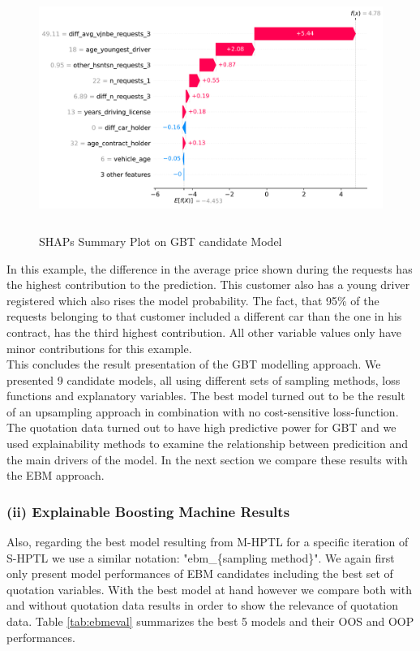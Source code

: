 \documentclass[12pt,titlepage]{article}
\begin{document}
\begin{figure}[H]
    \centerline{\includegraphics[height=8cm]{shap_waterfall_example.png}}
    \caption{SHAPs Summary Plot on GBT candidate Model}
    \label{fig:shapsum}
\end{figure}
\noindent
In this example, the difference in the average price shown during the requests has the highest contribution to the prediction. This customer also has a young driver registered which also rises the model probability. The fact, that 95\% of the requests belonging to that customer included a different car than the one in his contract, has the third highest contribution. All other variable values only have minor contributions for this example. \\
This concludes the result presentation of the GBT modelling approach. We presented 9 candidate models, all using different sets of sampling methods, loss functions and explanatory variables. The best model turned out to be the result of an upsampling approach in combination with no cost-sensitive loss-function. The quotation data turned out to have high predictive power for GBT and we used explainability methods to examine the relationship between predicition and the main drivers of the model. In the next section we compare these results with the EBM approach. \\

\subsubsection*{(ii) Explainable Boosting Machine Results}

Also, regarding the best model resulting from M-HPTL for a specific iteration of S-HPTL we use a similar notation: "ebm\_\{sampling method\}". We again first only present model performances of EBM candidates including the best set of quotation variables. With the best model at hand however we compare both with and without quotation data results in order to show the relevance of quotation data. Table \ref{tab:ebmeval} summarizes the best 5 models and their OOS and OOP performances.\\
\end{document}

